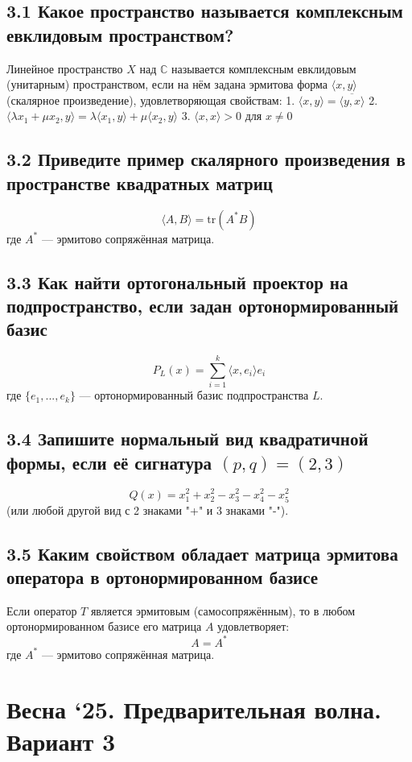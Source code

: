 \documentclass{article}
\begin{document}
\subsection*{3.1 Какое пространство называется комплексным евклидовым пространством?}
Линейное пространство \( X \) над \( \mathbb{C} \) называется комплексным евклидовым (унитарным) пространством, если на нём задана эрмитова форма \( \langle x, y \rangle \) (скалярное произведение), удовлетворяющая свойствам:
1. \( \langle x, y \rangle = \overline{\langle y, x \rangle} \)
2. \( \langle \lambda x_1 + \mu x_2, y \rangle = \lambda \langle x_1, y \rangle + \mu \langle x_2, y \rangle \)
3. \( \langle x, x \rangle > 0 \) для \( x \neq 0 \)

\subsection*{3.2 Приведите пример скалярного произведения в пространстве квадратных матриц}
\[\langle A, B \rangle = \text{tr}(A^* B)\]
где \( A^* \) — эрмитово сопряжённая матрица.

\subsection*{3.3 Как найти ортогональный проектор на подпространство, если задан ортонормированный базис}
\[P_L(x) = \sum_{i=1}^{k} \langle x, e_i \rangle e_i\]
где \( \{e_1, ..., e_k\} \) — ортонормированный базис подпространства \( L \).

\subsection*{3.4 Запишите нормальный вид квадратичной формы, если её сигнатура \( (p, q) = (2, 3) \)}
\[Q(x) = x_1^2 + x_2^2 - x_3^2 - x_4^2 - x_5^2\] (или любой другой вид с 2 знаками "+" и 3 знаками "-").

\subsection*{3.5 Каким свойством обладает матрица эрмитова оператора в ортонормированном базисе}
Если оператор \( T \) является эрмитовым (самосопряжённым), то в любом ортонормированном базисе его матрица \( A \) удовлетворяет:
\[A = A^*\]
где \( A^* \) — эрмитово сопряжённая матрица.

\newpage

\section*{Весна ‘25. Предварительная волна. Вариант 3}
\end{document}
